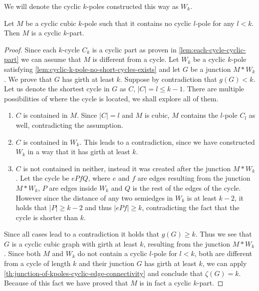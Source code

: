 \documentclass[12pt, twoside]{book}
\begin{document}
We will denote the cyclic $k$-poles constructed this way as $W_k$.

\begin{theorem}\label{th:alternative-definition-of-cyclic-part}
	Let $M$ be a cyclic cubic $k$-pole such that it contains no cyclic $l$-pole for any $l<k$. Then $M$ is a cyclic $k$-part.
\end{theorem}

\begin{proof}
	Since each $k$-cycle $C_k$ is a cyclic part as proven in \cref{lem:each-cycle-cyclic-part} we can assume that $M$ is different from a cycle. Let $W_k$ be a cyclic $k$-pole satisfying \cref{lem:cyclic-k-pole-no-short-cycles-exists} and let $G$ be a junction $M*W_k$. We prove that $G$ has girth at least $k$. Suppose by contradiction that $g(G)<k$. Let us denote the shortest cycle in $G$ as $C$, $|C|=l\leq k-1$. There are multiple possibilities of where the cycle is located, we shall explore all of them.
	\begin{enumerate}
		\item $C$ is contained in $M$. Since $|C|=l$ and $M$ is cubic, $M$ contains the $l$-pole $C_l$ as well, contradicting the assumption.
		\item $C$ is contained in $W_k$. This leads to a contradiction, since we have constructed $W_k$ in a way that it has girth at least $k$.
		\item $C$ is not contained in neither, instead it was created after the junction $M*W_k$. Let the cycle be $ePfQ$, where $e$ and $f$ are edges resulting from the junction $M*W_k$, $P$ are edges inside $W_k$ and $Q$ is the rest of the edges of the cycle. However since the distance of any two semiedges in $W_k$ is at least $k-2$, it holds that $|P|\geq k-2$ and thus $|ePf|\geq k$, contradicting the fact that the cycle is shorter than $k$.
	\end{enumerate}

	Since all cases lead to a contradiction it holds that $g(G)\geq k$. Thus we see that $G$ is a cyclic cubic graph with girth at least $k$, resulting from the junction $M*W_k$. Since both $M$ and $W_k$ do not contain a cyclic $l$-pole for $l<k$, both are different from a cycle of length $k$ and their junction $G$ has girth at least $k$, we can apply \cref{th:junction-of-kpoles-cyclic-edge-connectivity} and conclude that $\zeta(G)=k$. Because of this fact we have proved that $M$ is in fact a cyclic $k$-part.
\end{proof}

\end{document}
